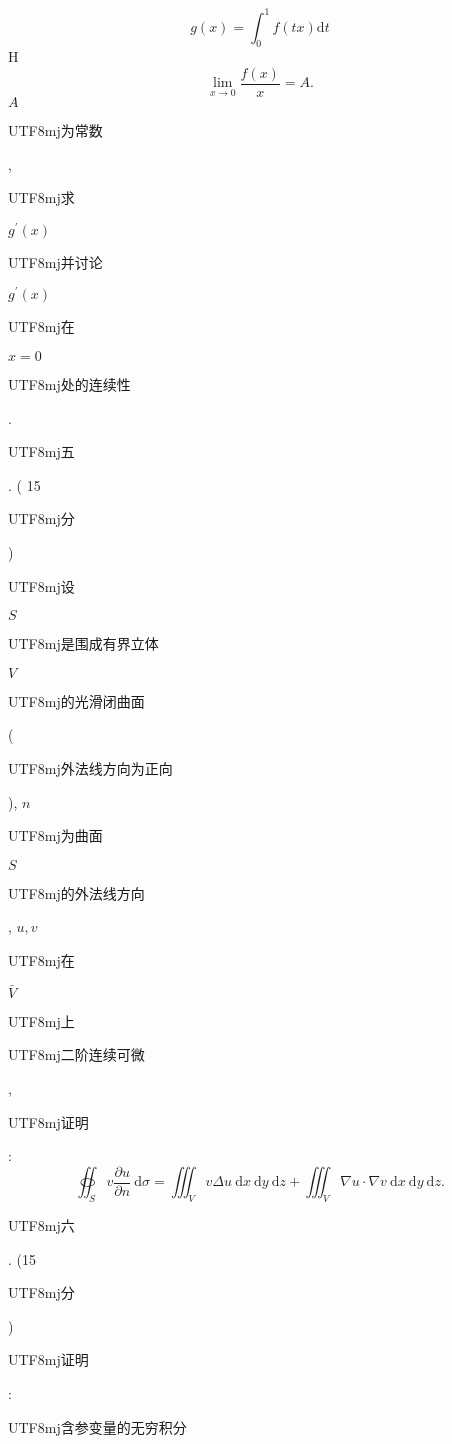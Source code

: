 \documentclass[10pt]{article}
\begin{document}
$$
g(x)=\int_{0}^{1} f(t x) \mathrm{d} t
$$
H
$$
\lim _{x \rightarrow 0} \frac{f(x)}{x}=A .
$$
$A$ \begin{CJK}{UTF8}{mj}为常数\end{CJK}, \begin{CJK}{UTF8}{mj}求\end{CJK} $g^{\prime}(x)$ \begin{CJK}{UTF8}{mj}并讨论\end{CJK} $g^{\prime}(x)$ \begin{CJK}{UTF8}{mj}在\end{CJK} $x=0$ \begin{CJK}{UTF8}{mj}处的连续性\end{CJK}.

\begin{CJK}{UTF8}{mj}五\end{CJK}. ( 15 \begin{CJK}{UTF8}{mj}分\end{CJK}) \begin{CJK}{UTF8}{mj}设\end{CJK} $S$ \begin{CJK}{UTF8}{mj}是围成有界立体\end{CJK} $V$ \begin{CJK}{UTF8}{mj}的光滑闭曲面\end{CJK} (\begin{CJK}{UTF8}{mj}外法线方向为正向\end{CJK}), $n$ \begin{CJK}{UTF8}{mj}为曲面\end{CJK} $S$ \begin{CJK}{UTF8}{mj}的外法线方向\end{CJK}, $u, v$ \begin{CJK}{UTF8}{mj}在\end{CJK} $\bar{V}$ \begin{CJK}{UTF8}{mj}上\end{CJK} \begin{CJK}{UTF8}{mj}二阶连续可微\end{CJK}, \begin{CJK}{UTF8}{mj}证明\end{CJK}:
$$
\oiint_{S} v \frac{\partial u}{\partial n} \mathrm{~d} \sigma=\iiint_{V} v \Delta u \mathrm{~d} x \mathrm{~d} y \mathrm{~d} z+\iiint_{V} \nabla u \cdot \nabla v \mathrm{~d} x \mathrm{~d} y \mathrm{~d} z .
$$
\begin{CJK}{UTF8}{mj}六\end{CJK}. (15 \begin{CJK}{UTF8}{mj}分\end{CJK}) \begin{CJK}{UTF8}{mj}证明\end{CJK}: \begin{CJK}{UTF8}{mj}含参变量的无穷积分\end{CJK}
\end{document}
